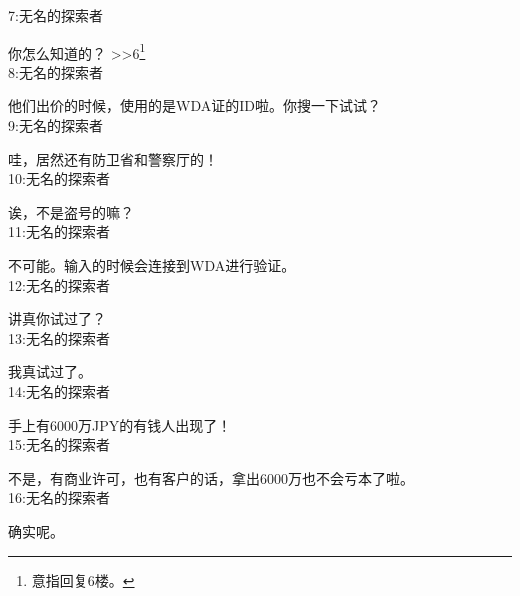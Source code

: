 7:无名的探索者

你怎么知道的？ >>6\footnote{意指回复6楼。}\\

8:无名的探索者

他们出价的时候，使用的是WDA证的ID啦。你搜一下试试？\\

9:无名的探索者

哇，居然还有防卫省和警察厅的！\\

10:无名的探索者

诶，不是盗号的嘛？\\

11:无名的探索者

不可能。输入的时候会连接到WDA进行验证。\\

12:无名的探索者

讲真你试过了？\\

13:无名的探索者

我真试过了。\\

14:无名的探索者

手上有6000万JPY的有钱人出现了！\\

15:无名的探索者

不是，有商业许可，也有客户的话，拿出6000万也不会亏本了啦。\\

16:无名的探索者

确实呢。\\


